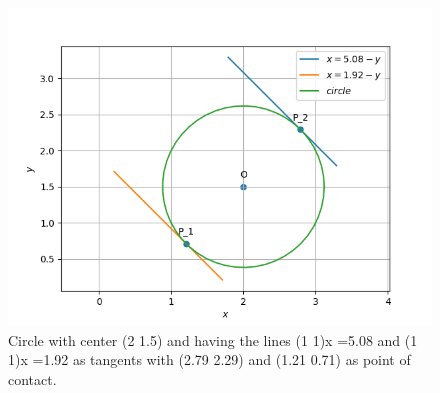 \documentclass[journal,12pt,twocolumn]{IEEEtran}
\begin{document}
\begin{figure}[]
\centering
\includegraphics[width=\columnwidth]{Figure_1.png}
\caption{Circle with center (2 1.5) and having the lines (1 1)x =5.08 and (1 1)x =1.92 as tangents with (2.79 2.29) and (1.21 0.71) as point of contact.}
\label{Fig:Circle}
\end{figure}
\end{document}
